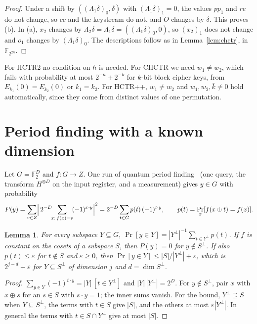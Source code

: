 \documentclass[11pt]{article}
\newtheorem{lemma}[theorem]{Lemma}
\theoremstyle{definition}
\theoremstyle{remark}
\newcommand{\F}{\mathbb{F}}
\newcommand{\eps}{\varepsilon}
\begin{document}
\begin{proof}
Under a shift by $((\Lambda_1\delta)_0,\delta)$ with $(\Lambda_1\delta)_1=0$, the values $pp_1$ and $re$ do not change, so $cc$ and the keystream do not, and $O$ changes by $\delta$. This proves (b). In (a), $x_2$ changes by $\Lambda_2\delta=\Lambda_1\delta=((\Lambda_1\delta)_0,0)$, so $(x_2)_1$ does not change and $o_1$ changes by $(\Lambda_1\delta)_0$. The descriptions follow as in Lemma~\ref{lem:chctr}, in $\F_{2^{2n}}$.
\end{proof}

For HCTR2 no condition on $h$ is needed. For CHCTR we need $w_1\ne w_2$, which fails with probability at most $2^{-n}+2^{-k}$ for $k$-bit block cipher keys, from $E_{k_1}(0)=E_{k_2}(0)$ or $k_1=k_2$. For HCTR++, $w_1\ne w_2$ and $w_1,w_2,\bar k\ne0$ hold automatically, since they come from distinct values of one permutation.

\section{Period finding with a known dimension}\label{sec:period}

Let $G=\F_2^D$ and $f:G\to Z$. One run of quantum period finding~\cite{Sim97} (one query, the transform $H^{\otimes D}$ on the input register, and a measurement) gives $y\in G$ with probability
\[
P(y)=\sum_{v\in Z}\Bigl|\,2^{-D}\!\!\sum_{x:\,f(x)=v}\!(-1)^{x\cdot y}\Bigr|^2=2^{-D}\sum_{t\in G}p(t)\,(-1)^{t\cdot y},\qquad p(t)=\Pr_x[f(x\oplus t)=f(x)].
\]

\begin{lemma}\label{lem:sample}
For every subspace $Y\subseteq G$, $\Pr[y\in Y]=|Y^\perp|^{-1}\sum_{t\in Y^\perp}p(t)$. If $f$ is constant on the cosets of a subspace $S$, then $P(y)=0$ for $y\notin S^\perp$. If also $p(t)\le\eps$ for $t\notin S$ and $\eps\ge0$, then $\Pr[y\in Y]\le|S|/|Y^\perp|+\eps$, which is $2^{j-d}+\eps$ for $Y\subseteq S^\perp$ of dimension $j$ and $d=\dim S^\perp$.
\end{lemma}

\begin{proof}
$\sum_{y\in Y}(-1)^{t\cdot y}=|Y|\,[t\in Y^\perp]$ and $|Y|\,|Y^\perp|=2^D$. For $y\notin S^\perp$, pair $x$ with $x\oplus s$ for an $s\in S$ with $s\cdot y=1$; the inner sums vanish. For the bound, $Y^\perp\supseteq S$ when $Y\subseteq S^\perp$, the terms with $t\in S$ give $|S|$, and the others at most $\eps|Y^\perp|$. In general the terms with $t\in S\cap Y^\perp$ give at most $|S|$.
\end{proof}
\end{document}

